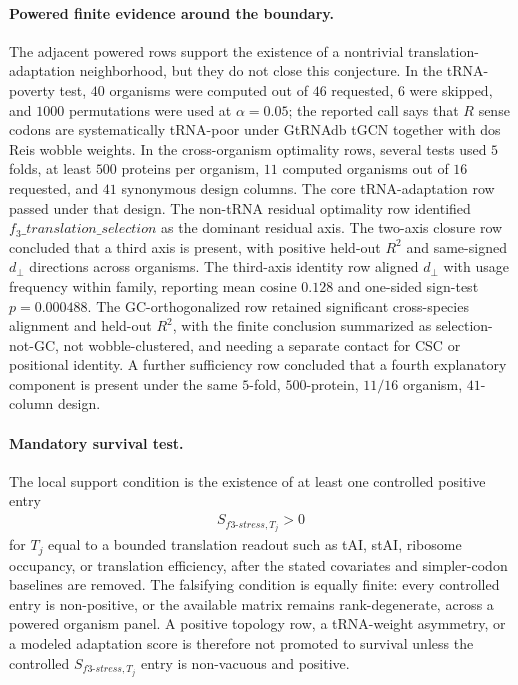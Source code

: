 \paragraph{Powered finite evidence around the boundary.}
The adjacent powered rows support the existence of a nontrivial translation-adaptation neighborhood, but they do not close this conjecture. In the tRNA-poverty test, $40$ organisms were computed out of $46$ requested, $6$ were skipped, and $1000$ permutations were used at $\alpha=0.05$; the reported call says that $R$ sense codons are systematically tRNA-poor under GtRNAdb tGCN together with dos Reis wobble weights. In the cross-organism optimality rows, several tests used $5$ folds, at least $500$ proteins per organism, $11$ computed organisms out of $16$ requested, and $41$ synonymous design columns. The core tRNA-adaptation row passed under that design. The non-tRNA residual optimality row identified $f_3\_translation\_selection$ as the dominant residual axis. The two-axis closure row concluded that a third axis is present, with positive held-out $R^2$ and same-signed $d_\perp$ directions across organisms. The third-axis identity row aligned $d_\perp$ with usage frequency within family, reporting mean cosine $0.128$ and one-sided sign-test $p=0.000488$. The GC-orthogonalized row retained significant cross-species alignment and held-out $R^2$, with the finite conclusion summarized as selection-not-GC, not wobble-clustered, and needing a separate contact for CSC or positional identity. A further sufficiency row concluded that a fourth explanatory component is present under the same $5$-fold, $500$-protein, $11/16$ organism, $41$-column design.

\paragraph{Mandatory survival test.}
The local support condition is the existence of at least one controlled positive entry
$$
\begin{aligned}
S_{f3\text{-}stress,T_j}>0
\end{aligned}
$$
for $T_j$ equal to a bounded translation readout such as tAI, stAI, ribosome occupancy, or translation efficiency, after the stated covariates and simpler-codon baselines are removed. The falsifying condition is equally finite: every controlled entry is non-positive, or the available matrix remains rank-degenerate, across a powered organism panel. A positive topology row, a tRNA-weight asymmetry, or a modeled adaptation score is therefore not promoted to survival unless the controlled $S_{f3\text{-}stress,T_j}$ entry is non-vacuous and positive.

